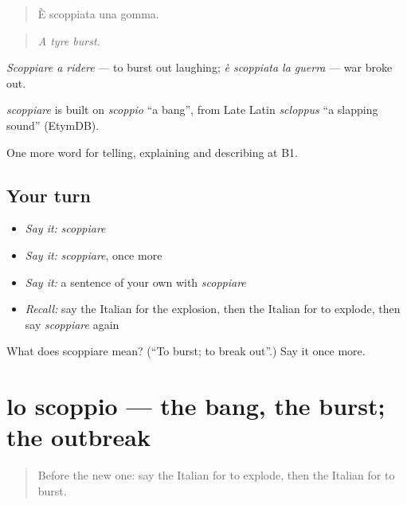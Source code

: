\begin{quote}
È scoppiata una gomma.
\end{quote}

\begin{quote}
\emph{A tyre burst.}
\end{quote}

\emph{Scoppiare a ridere} — to burst out laughing; \emph{è scoppiata la guerra} — war broke out.

\begin{cousinweb}
\emph{scoppiare} is built on \emph{scoppio} \textquotedblleft{}a bang\textquotedblright{}, from Late Latin \emph{scloppus} \textquotedblleft{}a slapping sound\textquotedblright{} (EtymDB).
\end{cousinweb}

\begin{grammarlens}[title={What you've built}]
One more word for telling, explaining and describing at B1.
\end{grammarlens}

\subsection*{Your turn}
\begin{itemize}
\raggedright
  \item \emph{Say it:} \emph{scoppiare}
  \item \emph{Say it:} \emph{scoppiare}, once more
  \item \emph{Say it:} a sentence of your own with \emph{scoppiare}
  \item \emph{Recall:} say the Italian for the explosion, then the Italian for to explode, then say \emph{scoppiare} again
\end{itemize}

\begin{tcolorbox}[breakable,colback=teal!4,colframe=teal!35!black,title={Before you move on}]
What does scoppiare mean? (\textquotedblleft{}To burst; to break out\textquotedblright{}.) Say it once more.
\end{tcolorbox}
\section[lo scoppio]{lo scoppio — the bang, the burst; the outbreak}

\label{lesson:IT-C303-scoppio}



\begin{quote}
Before the new one: say the Italian for to explode, then the Italian for to burst.
\end{quote}

